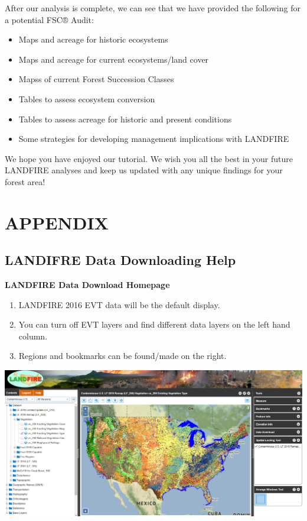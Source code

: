 \documentclass[
]{book}
\providecommand{\tightlist}{%
  \setlength{\itemsep}{0pt}\setlength{\parskip}{0pt}}
\begin{document}
After our analysis is complete, we can see that we have provided the following for a potential FSC® Audit:

\begin{itemize}
\tightlist
\item
  Maps and acreage for historic ecosystems
\item
  Maps and acreage for current ecosystems/land cover
\item
  Mapss of current Forest Succession Classes
\item
  Tables to assess ecosystem conversion
\item
  Tables to assess acreage for historic and present conditions
\item
  Some strategies for developing management implications with LANDFIRE
\end{itemize}

We hope you have enjoyed our tutorial. We wish you all the best in your future LANDFIRE analyses and keep us updated with any unique findings for your forest area!

\hypertarget{appendix}{%
\chapter{APPENDIX}\label{appendix}}

\hypertarget{landifre-data-downloading-help}{%
\section{LANDIFRE Data Downloading Help}\label{landifre-data-downloading-help}}

\textbf{LANDFIRE Data Download Homepage}

\begin{enumerate}
\def\labelenumi{\arabic{enumi}.}
\tightlist
\item
  LANDFIRE 2016 EVT data will be the default display.
\item
  You can turn off EVT layers and find different data layers on the left hand column.
\item
  Regions and bookmarks can be found/made on the right.
\end{enumerate}

\includegraphics[width=1000px]{KP_screenshots/LANDFIRE First Load}
\end{document}
